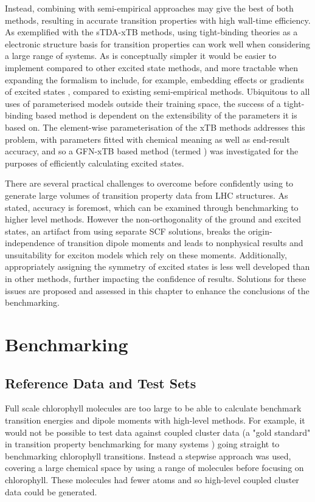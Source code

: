 Instead, combining \dscf with semi-empirical approaches may give the best of both
methods, resulting in accurate transition properties with high wall-time efficiency.
As exemplified with the sTDA-xTB methods, using tight-binding theories as a electronic 
structure basis for transition properties can work well when considering a large
range of systems. As \dscf is conceptually simpler it would be easier to implement
compared to other excited state methods, and more tractable when expanding the formalism
to include, for example, embedding effects or gradients of excited states \cite{Worster2021},
compared to existing semi-empirical methods. Ubiquitous to all uses of parameterised 
models outside their training space, the success of a tight-binding based \dscf 
method is dependent on the extensibility of the parameters it is based on. The element-wise
parameterisation of the xTB methods addresses this problem, with parameters fitted
with chemical meaning as well as end-result accuracy, and so a GFN-xTB based \dscf
method (termed \dxtb) was investigated for the purposes of efficiently calculating
excited states.

There are several practical challenges to overcome before confidently using \dscf
to generate large volumes of transition property data from LHC structures. As stated,
accuracy is foremost, which can be examined through benchmarking to higher level
methods. However the non-orthogonality of the ground and excited states, an artifact
from using separate SCF solutions, breaks the origin-independence of transition
dipole moments and leads to nonphysical results and unsuitability for exciton models
which rely on these moments. Additionally, appropriately assigning the symmetry of
excited states is less well developed than in other methods, further impacting the 
confidence of results. Solutions for these issues are proposed and assessed in this
chapter to enhance the conclusions of the benchmarking.

\section{Benchmarking \dscf}
\label{sec:benchmarking}
\subsection{Reference Data and Test Sets}
\label{subsec:reference_data}

Full scale chlorophyll molecules are too large to be able to calculate benchmark
transition energies and dipole moments with high-level methods. For example, it would
not be possible to test \dscf data against coupled cluster data (a "gold standard"
in transition property benchmarking for many systems \cite{Donchev2021}) going straight
to benchmarking chlorophyll transitions. Instead a stepwise approach was used, covering
a large chemical space by using a range of molecules before focusing on chlorophyll.
These molecules had fewer atoms and so high-level coupled cluster data could be generated.

